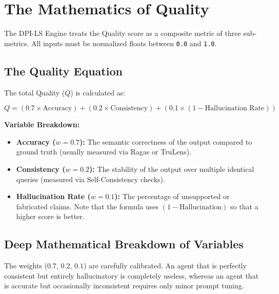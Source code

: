 \documentclass[11pt,a4paper]{article}
\begin{document}
\newpage

\section{The Mathematics of Quality}

The DPI-LS Engine treats the Quality score as a composite metric of three sub-metrics. All inputs must be normalized floats between \texttt{0.0} and \texttt{1.0}.

\subsection{The Quality Equation}

The total Quality ($Q$) is calculated as:

\vspace{0.5cm}
\begin{tcolorbox}[colback=dpilight, colframe=dpigreen, title=\textbf{DPI-LS Quality Formula}]
\[ Q = (0.7 \times \text{Accuracy}) + (0.2 \times \text{Consistency}) + (0.1 \times (1 - \text{Hallucination Rate})) \]
\end{tcolorbox}
\vspace{0.5cm}

\textbf{Variable Breakdown:}
\begin{itemize}
    \item \textbf{Accuracy ($w=0.7$):} The semantic correctness of the output compared to ground truth (usually measured via Ragas or TruLens).
    \item \textbf{Consistency ($w=0.2$):} The stability of the output over multiple identical queries (measured via Self-Consistency checks).
    \item \textbf{Hallucination Rate ($w=0.1$):} The percentage of unsupported or fabricated claims. Note that the formula uses $(1 - \text{Hallucination})$ so that a higher score is better.
\end{itemize}

\subsection{Deep Mathematical Breakdown of Variables}

The weights ($0.7$, $0.2$, $0.1$) are carefully calibrated. An agent that is perfectly consistent but entirely hallucinatory is completely useless, whereas an agent that is accurate but occasionally inconsistent requires only minor prompt tuning.
\end{document}
